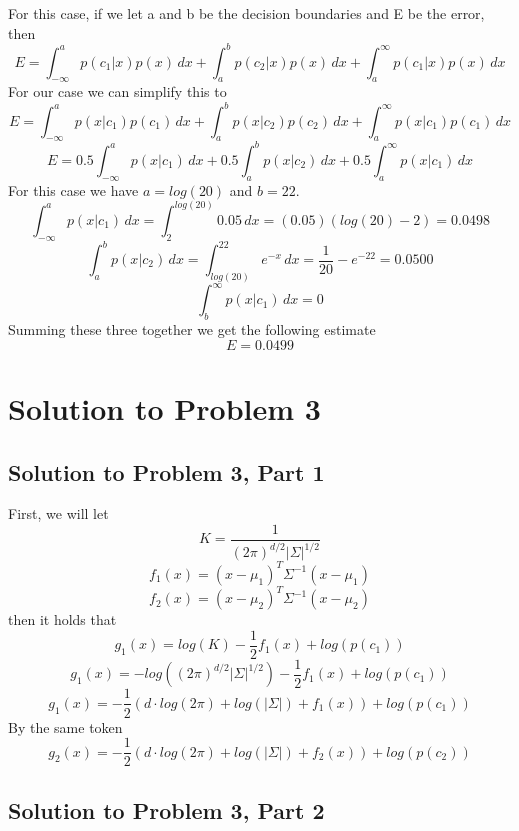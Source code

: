 \documentclass[11pt,psfig]{article}
\begin{document}
For this case, if we let a and b be the decision boundaries and E be the error, then
\[
E = \int_{-\infty}^{a}{p(c_1|x)p(x) \, dx} + \int_{a}^{b}{p(c_2|x)p(x) \, dx} + \int_{a}^{\infty}{p(c_1|x)p(x) \, dx}
\]
For our case we can simplify this to
\[
E = \int_{-\infty}^{a}{p(x|c_1)p(c_1) \, dx} + \int_{a}^{b}{p(x|c_2)p(c_2) \, dx} + \int_{a}^{\infty}{p(x|c_1)p(c_1) \, dx}
\]
\[
E = 0.5\int_{-\infty}^{a}{p(x|c_1) \, dx} + 0.5\int_{a}^{b}{p(x|c_2) \, dx} + 0.5\int_{a}^{\infty}{p(x|c_1) \, dx}
\]
For this case we have $a=log(20)$ and $b=22$. \\
\[
\int_{-\infty}^{a}{p(x|c_1) \, dx} = \int_{2}^{log(20)}{0.05 \, dx} = (0.05)(log(20)-2) = 0.0498
\]
\[
\int_{a}^{b}{p(x|c_2) \, dx} = \int_{log(20)}^{22}{e^{-x} \, dx} = \frac{1}{20} - e^{-22} = 0.0500
\]
\[
\int_{b}^{\infty}{p(x|c_1) \, dx} = 0
\]
Summing these three together we get the following estimate
\[
E = 0.0499
\]
\newpage
\section*{Solution to Problem 3}
\subsection*{Solution to Problem 3, Part 1}
First, we will let
\[
K = \frac{1}{(2\pi)^{d/2}|\Sigma|^{1/2}}
\]
\[
f_1(x) = (x-\mu_1)^T \Sigma^{-1} (x-\mu_1)
\]
\[
f_2(x) = (x-\mu_2)^T \Sigma^{-1} (x-\mu_2)
\]
then it holds that
\[
g_1(x) = log(K) - \frac{1}{2}f_1(x) + log(p(c_1))
\]
\[
g_1(x) = -log((2\pi)^{d/2} |\Sigma|^{1/2}) - \frac{1}{2}f_1(x) + log(p(c_1))
\]
\[
g_1(x) = -\frac{1}{2}( d \cdot log(2\pi) + log(|\Sigma|) + f_1(x)) + log(p(c_1))
\]
By the same token
\[
g_2(x) = -\frac{1}{2}( d \cdot log(2\pi) + log(|\Sigma|) + f_2(x)) + log(p(c_2))
\]

\subsection*{Solution to Problem 3, Part 2}
\end{document}
